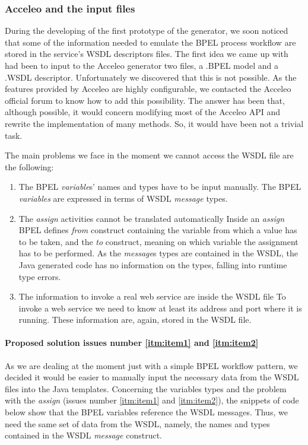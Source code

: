 \subsubsection{Acceleo and the input files}
\label{sec:IssueInputFiles}
During the developing of the first prototype of the generator, we soon noticed that some of the information needed to emulate the BPEL process workflow are stored in the service's WSDL descriptors files. 
The first idea we came up with had been to input to the Acceleo generator two files, a .BPEL model and a .WSDL descriptor. Unfortunately we discovered that this is not possible. As the features provided by Acceleo are highly configurable, we contacted the Acceleo official forum \cite{acceleoForum} to know how to add this possibility. The answer has been that, although possible, it would concern modifying most of the Acceleo API and rewrite the implementation of many methods. So, it would have been not a trivial task.

The main problems we face in the moment we cannot access the WSDL file are the following: 
\begin{enumerate}
  \item \label{itm:item1}The BPEL \textit{variable}s' names and types have to be input manually. 
    \subitem The BPEL \textit{variables} are expressed in terms of WSDL \textit{message} types.  
  \item \label{itm:item2}The \textit{assign} activities cannot be translated automatically
    \subitem Inside an \textit{assign} BPEL defines \textit{from} construct containing the variable from which a value has to be taken, and the \textit{to} construct, meaning on which variable the assignment has to be performed. As the \textit{message}s types are contained in the WSDL, the Java generated code has no information on the types, falling into runtime type errors.
  \item \label{itm:item3}The information to invoke a real web service are inside the WSDL file
    \subitem To invoke a web service we need to know at least its address and port where it is running. These information are, again, stored in the WSDL file. 
\end{enumerate}

\paragraph{Proposed solution issues number \ref{itm:item1} and \ref{itm:item2}}
As we are dealing at the moment just with a simple BPEL workflow pattern, we decided it would be easier to manually input the necessary data from the WSDL files into the Java templates.
Concerning the variables types and the problem with the \textit{assign} (issues number \ref{itm:item1} and \ref{itm:item2}), the snippets of code below show that the BPEL variables reference the WSDL messages. Thus, we need the same set of data from the WSDL, namely, the names and types contained in the WSDL \textit{message} construct. 

